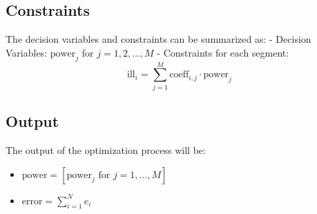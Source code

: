 \documentclass{article}
\begin{document}
\subsection*{Constraints}
The decision variables and constraints can be summarized as:
- Decision Variables: \( \text{power}_j \) for \( j = 1, 2, \ldots, M \)
- Constraints for each segment:
\[
\text{ill}_i = \sum_{j=1}^{M} \text{coeff}_{i,j} \cdot \text{power}_j
\]

\subsection*{Output}
The output of the optimization process will be:
\begin{itemize}
    \item \( \text{power} = [\text{power}_j \text{ for } j = 1, \ldots, M] \)
    \item \( \text{error} = \sum_{i=1}^{N} e_i \)
\end{itemize}
\end{document}
